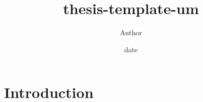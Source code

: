 \documentclass{thesis}
\title{thesis-template-um}
\author{Author}
\date{date}
\begin{document}
\maketitle

\section{Introduction}

\lipsum
\end{document}
